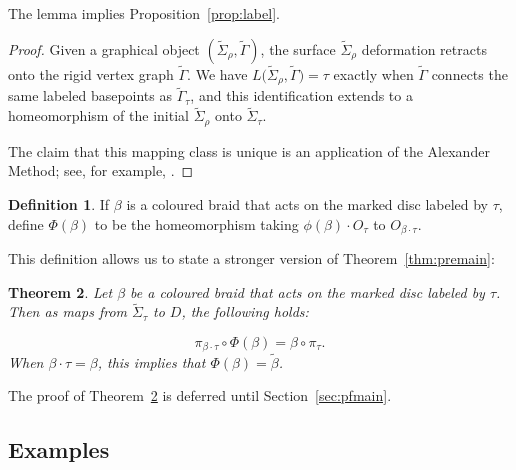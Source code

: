 \documentclass{amsart}
\newtheorem{theorem}{Theorem}[section]
\theoremstyle{definition}
\newtheorem{definition}[theorem]{Definition}
\def\ws{\widetilde{\Sigma}}
\begin{document}
The lemma implies Proposition~\ref{prop:label}.

\begin{proof} Given a graphical object $(\ws_\rho, \widetilde\Gamma)$, the surface $\ws_\rho$ deformation retracts onto the rigid vertex graph $\widetilde{\Gamma}$.  We have $L\big(\ws_\rho, \widetilde{\Gamma}\big)=\tau$ exactly when $\widetilde{\Gamma}$ connects the same labeled basepoints as $\widetilde{\Gamma}_\tau$, and this identification extends to a homeomorphism of the initial $\ws_\rho$ onto $\ws_\tau$.

 The claim that this mapping class is unique is an application of the Alexander Method; see, for example,  \cite[Section 2.3]{FM}.
\end{proof}


\begin{definition}\label{def:Phi} If $\beta$ is a coloured braid that acts on the marked disc labeled by $\tau$, define  $\Phi(\beta)$ to be the homeomorphism taking $\phi(\beta) \cdot O_\tau$ to $O_{\beta\cdot \tau}$.  \end{definition} 

This definition allows us to state a stronger version of Theorem~\ref{thm:premain}:


\begin{theorem}\label{thm:main}\label{thm:lift} Let $\beta$ be a coloured braid that acts on the marked disc labeled by $\tau$.  Then as maps from $\ws_\tau$ to $D$, the following  holds:

  \[ \pi_{\beta\cdot \tau}\circ \Phi(\beta)=\beta\circ \pi_\tau.\]
When $\beta\cdot \tau=\beta$, this implies that $\Phi(\beta)=\widetilde{\beta}$.
\end{theorem} 

The proof of Theorem~\ref{thm:main} is deferred until Section~\ref{sec:pfmain}.




\subsection{Examples}\label{sec:ex}
\end{document}
